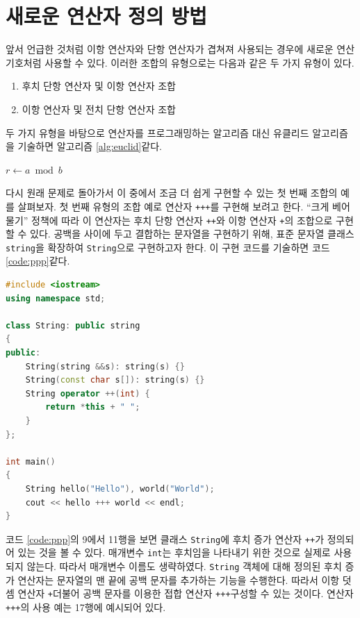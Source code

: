 \documentclass[titlepage]{pnureport}
\begin{document}
\section{새로운 연산자 정의 방법}

앞서 언급한 것처럼 이항 연산자와 단항 연산자가 겹쳐져 사용되는 경우에 새로운 연산 기호처럼 사용할 수 있다. 이러한 조합의 유형으로는 다음과 같은 두 가지 유형이 있다.
\begin{enumerate}
\item 후치 단항 연산자 및 이항 연산자 조합
\item 이항 연산자 및 전치 단항 연산자 조합
\end{enumerate}
두 가지 유형을 바탕으로 연산자를 프로그래밍하는 알고리즘 대신 유클리드 알고리즘을 기술하면 알고리즘 \ref{alg:euclid}\와 같다.

\begin{algorithm}[H]
  \caption{유클리드 호제법}
  \label{alg:euclid}
  $r \gets a \bmod b$\;
  \\
  \;            
\end{algorithm}
\vspace*{1ex}

다시 원래 문제로 돌아가서 이 중에서 조금 더 쉽게 구현할 수 있는 첫 번째 조합의 예를 살펴보자. 첫 번째 유형의 조합 예로 연산자 \texttt{+++}를 구현해 보려고 한다. ``크게 베어 물기'' 정책에 따라 이 연산자는 후치 단항 연산자 \texttt{++}와 이항 연산자 \texttt{+}의 조합으로 구현할 수 있다. 공백을 사이에 두고 결합하는 문자열을 구현하기 위해, 표준 문자열 클래스 \texttt{string}을 확장하여 \texttt{String}으로 구현하고자 한다. 이 구현 코드를 기술하면 코드 \ref{code:ppp}\과 같다.
\begin{lstlisting}[language=c++,caption={연산자 \texttt{+++}의 구현 코드},label=code:ppp]
#include <iostream>
using namespace std;

class String: public string
{
public:
    String(string &&s): string(s) {}
    String(const char s[]): string(s) {}
    String operator ++(int) {
        return *this + " ";
    }
};

int main()
{
    String hello("Hello"), world("World");
    cout << hello +++ world << endl;
}
\end{lstlisting}
코드 \ref{code:ppp}의 9에서 11행을 보면 클래스 \texttt{String}에 후치 증가 연산자 \texttt{++}가 정의되어 있는 것을 볼 수 있다. 매개변수 \texttt{int}는 후치임을 나타내기 위한 것으로 실제로 사용되지 않는다. 따라서 매개변수 이름도 생략하였다. \texttt{String} 객체에 대해 정의된 후치 증가 연산자는 문자열의 맨 끝에 공백 문자를 추가하는 기능을 수행한다. 따라서 이항 덧셈 연산자 \texttt{+}\과 더불어 공백 문자를 이용한 접합 연산자 \texttt{+++}\를 구성할 수 있는 것이다. 연산자 \texttt{+++}의 사용 예는 17행에 예시되어 있다.
\end{document}

